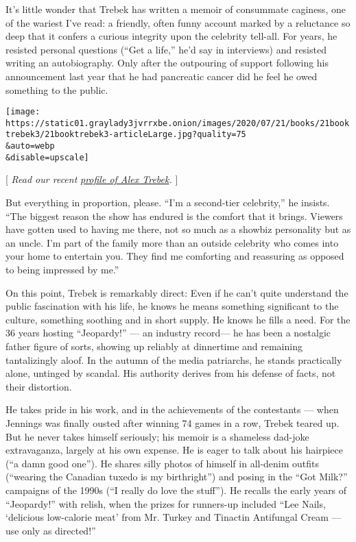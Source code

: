 It's little wonder that Trebek has written a memoir of consummate
caginess, one of the wariest I've read: a friendly, often funny account
marked by a reluctance so deep that it confers a curious integrity upon
the celebrity tell-all. For years, he resisted personal questions (``Get
a life,'' he'd say in interviews) and resisted writing an autobiography.
Only after the outpouring of support following his announcement last
year that he had pancreatic cancer did he feel he owed something to the
public.

\texttt{[image: https://static01.graylady3jvrrxbe.onion/images/2020/07/21/books/21booktrebek3/21booktrebek3-articleLarge.jpg?quality=75\\\&auto=webp\\\&disable=upscale]}

{[} \emph{Read our recent}
\href{https://www.nytimes3xbfgragh.onion/2020/07/17/books/alex-trebek-jeopardy-the-answer-is.html}{\emph{profile
of Alex Trebek}}\emph{.} {]}

But everything in proportion, please. ``I'm a second-tier celebrity,''
he insists. ``The biggest reason the show has endured is the comfort
that it brings. Viewers have gotten used to having me there, not so much
as a showbiz personality but as an uncle. I'm part of the family more
than an outside celebrity who comes into your home to entertain you.
They find me comforting and reassuring as opposed to being impressed by
me.''

On this point, Trebek is remarkably direct: Even if he can't quite
understand the public fascination with his life, he knows he means
something significant to the culture, something soothing and in short
supply. He knows he fills a need. For the 36 years hosting ``Jeopardy!''
--- an industry record--- he has been a nostalgic father figure of
sorts, showing up reliably at dinnertime and remaining tantalizingly
aloof. In the autumn of the media patriarchs, he stands practically
alone, untinged by scandal. His authority derives from his defense of
facts, not their distortion.

He takes pride in his work, and in the achievements of the contestants
--- when Jennings was finally ousted after winning 74 games in a row,
Trebek teared up. But he never takes himself seriously; his memoir is a
shameless dad-joke extravaganza, largely at his own expense. He is eager
to talk about his hairpiece (``a damn good one''). He shares silly
photos of himself in all-denim outfits (``wearing the Canadian tuxedo is
my birthright'') and posing in the ``Got Milk?'' campaigns of the 1990s
(``I really do love the stuff''). He recalls the early years of
``Jeopardy!'' with relish, when the prizes for runners-up included ``Lee
Nails, `delicious low-calorie meat' from Mr. Turkey and Tinactin
Antifungal Cream --- use only as directed!''


